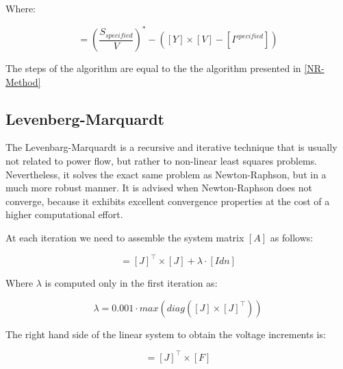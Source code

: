 \documentclass[nols,a4paper,twoside,notoc,fleqn]{tufte-book}
\begin{document}
Where:

\begin{equation}
[\Delta I] = \left( \frac{S_{specified}}{V} \right)^*  - ([Y] \times [V] - [I^{specified}])
\label{eq:nri_i_inc}
\end{equation}

The steps of the algorithm are equal to the the algorithm presented in \ref{NR-Method}





\newpage
\subsection{Levenberg-Marquardt} \label{LM-Method}

The Levenbarg-Marquardt is a recursive and iterative technique that is usually not related to power flow, but rather to non-linear least squares problems. Nevertheless, it solves the exact same problem as Newton-Raphson, but in a much more robust manner. It is advised when Newton-Raphson does not converge, because it exhibits excellent convergence properties at the cost of a higher computational effort.


At each iteration we need to assemble the system matrix $[A]$ as follows:
%
%
%


\begin{equation}
[A] = [J]^\top \times [J] + \lambda \cdot [Idn]
\label{eq:lm_A}
\end{equation}


Where $\lambda$ is computed only in the first iteration as:

\begin{equation}
\lambda = 0.001 \cdot max(diag([J] \times [J]^\top))
\end{equation}

The right hand side of the linear system to obtain the voltage increments is:


\begin{equation}
[rhs] = [J]^\top \times [F]
\label{eq:lm_rhs}
\end{equation}
\end{document}
